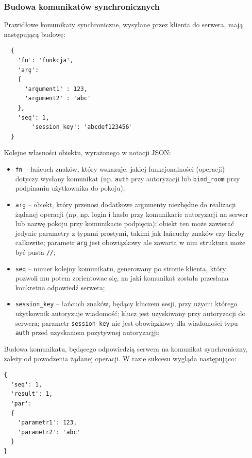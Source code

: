 \subsubsection{Budowa komunikatów synchronicznych}
Prawidłowe komunikaty synchroniczne, wysyłane przez klienta do serwera, mają
następującą budowę:
\begin{lstlisting}
  {
    'fn': 'funkcja',
    'arg':
    {
      'argument1' : 123,
      'argument2' : 'abc'
    },
    'seq': 1,
		'session_key': 'abcdef123456'
  }
\end{lstlisting}

Kolejne własności obiektu, wyrażonego w notacji JSON:
\begin{itemize}
	\item \texttt{fn} -- łańcuch znaków, który wskazuje, jakiej funkcjonalności
	(operacji) dotyczy wysłany komunikat (np. \texttt{auth} przy autoryzacji
	lub \texttt{bind\_room} przy podpinaniu użytkownika do pokoju);

	\item \texttt{arg} -- obiekt, który przenosi dodatkowe argumenty niezbędne do
	realizacji żądanej operacji (np. np. login i hasło przy komunikacie autoryzacji na
	serwer lub nazwę pokoju przy komunikacie podpięcia); obiekt ten może zawierać jedynie
	parametry z typami prostymi, takimi jak łańcuchy znaków czy liczby całkowite;
	parametr \texttt{arg} jest obowiązkowy ale zawarta w nim struktura może być
	pusta \texttt{/{/}};

	\item \texttt{seq} -- numer kolejny komunikatu, generowany po stronie klienta,
	który pozwoli mu potem zorientowac się, na jaki komunikat została przesłana
	konkretna odpowiedź serwera;

	\item \texttt{session\_key} -- łańcuch znaków, będący kluczem sesji, przy użyciu
	którego użytkownik autoryzuje wiadomość; klucz jest uzyskiwany przy autoryzacji
	do serwera; parametr \texttt{session\_key} nie jest obowiązkowy dla wiadomości typu
	\texttt{auth} przed uzyskaniem pozytywnej autoryzacjji;
\end{itemize}

Budowa komunikatu, będącego odpowiedzią serwera na komunikat synchroniczny,
zależy od powodzenia żądanej operacji. W razie sukcesu wygląda następująco:

\begin{lstlisting}
{
  'seq': 1,
  'result': 1,
  'par':
  {
    'parametr1': 123,
    'parametr2': 'abc'
  }
}
\end{lstlisting}

